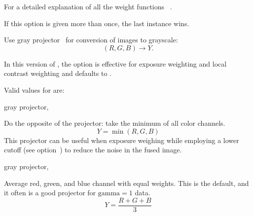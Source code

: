 \begin{codelist}
\begin{table}[htbp]
    \caption[Exposure weight functions]{\label{tab:exposure-weight-functions}%
      Predefined exposure weight functions.  For a graphical comparison see
      \figureName~\ref{fig:exposure-weights}.}
  \end{table}

  For a detailed explanation of all the weight functions
  \sectionName~.

  If this option is given more than once, the last instance wins.


  \label{opt:gray-projector}%
\item[--gray-projector=\metavar{PROJECTOR}]\itemend
  Use gray projector~ for conversion of  images to grayscale:
  \[
  (R, G, B) \rightarrow Y.
  \]

  In this version of \App{}, the option is effective for exposure weighting and local contrast
  weighting and  defaults to .

  Valid values for  are:

  \begin{codelist}
           {gray projector, }%
  \item[anti-value]\itemend
    Do the opposite of the  projector: take the minimum of all color channels.
    \[
    Y = \min(R, G, B)
    \]
    This projector can be useful when exposure weighing while employing a lower cutoff (see
    option~) to reduce the noise in the fused image.

           {gray projector, }%
  \item[average]\itemend
    Average red, green, and blue channel with equal weights.  This is the default, and it often
    is a good projector for $\mbox{gamma} = 1$ data.
    \[
    Y = \frac{R + G + B}{3}
    \]


\end{codelist}
\end{codelist}
